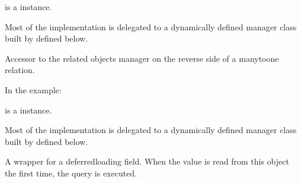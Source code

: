 \documentclass[letterpaper,10pt,english]{sphinxmanual}
\begin{document}
\begin{fulllineitems}
\begin{fulllineitems}
 is a  instance.

Most of the implementation is delegated to a dynamically defined manager
class built by  defined below.

\end{fulllineitems}


\begin{fulllineitems}
\label{\detokenize{accounts:accounts.models.User.comment2_set}}
Accessor to the related objects manager on the reverse side of a
many\sphinxhyphen{}to\sphinxhyphen{}one relation.

In the example:

\begin{sphinxVerbatim}[commandchars=\\\{\}]
 
       
\end{sphinxVerbatim}

 is a  instance.

Most of the implementation is delegated to a dynamically defined manager
class built by  defined below.

\end{fulllineitems}


\begin{fulllineitems}
\label{\detokenize{accounts:accounts.models.User.dob}}
A wrapper for a deferred\sphinxhyphen{}loading field. When the value is read from this
object the first time, the query is executed.

\end{fulllineitems}


\end{fulllineitems}
\end{document}
